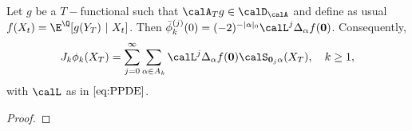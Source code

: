  \begin{lemma}\label{lem:chaos2}
  Let $g$ be a $T-$functional such that $\calA_T g \in \calD_{\calA}$ and define as usual $f(X_t) = \E^{\Q}[g(Y_T) \ | \ X_t]$.  
  Then $\bar{\phi}^{(j)}_k(0)  = (-2)^{-|\alpha|_0}\calL^{j} \Delta_{\alpha} f(\boldsymbol{0})$. Consequently, 
 \begin{equation}
      J_k \phi_k (X_T) = \sum_{j=0}^{\infty}   \sum_{\alpha \in A_k}  \calL^{j} \Delta_{\alpha} f(\boldsymbol{0}) \calS_{\boldsymbol{0}_j\alpha} (X_T), \quad k \ge 1, 
 \end{equation}
  with $\calL$ as in $\eqref{eq:PPDE}$. 
 
 \end{lemma}
 
 \begin{proof}
 

\end{proof}

